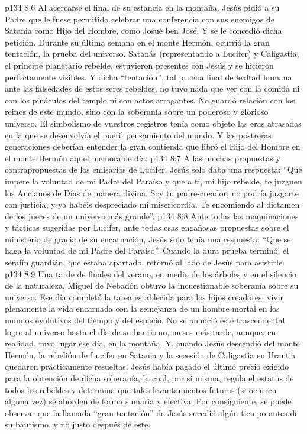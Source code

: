 \vs p134 8:6 \pc Al acercarse el final de su estancia en la montaña, Jesús pidió a su Padre que le fuese permitido celebrar una conferencia con sus enemigos de Satania como Hijo del Hombre, como Josué ben José. Y se le concedió dicha petición. Durante su última semana en el monte Hermón, ocurrió la gran tentación, la prueba del universo. Satanás (representando a Lucifer) y Caligastia, el príncipe planetario rebelde, estuvieron presentes con Jesús y se hicieron perfectamente visibles. Y dicha “tentación”, tal prueba final de lealtad humana ante las falsedades de estos seres rebeldes, no tuvo nada que ver con la comida ni con los pináculos del templo ni con actos arrogantes. No guardó relación con los reinos de este mundo, sino con la soberanía sobre un poderoso y glorioso universo. El simbolismo de vuestros registros tenía como objeto las eras atrasadas en la que se desenvolvía el pueril pensamiento del mundo. Y las postreras generaciones deberían entender la gran contienda que libró el Hijo del Hombre en el monte Hermón aquel memorable día.
\vs p134 8:7 A las muchas propuestas y contrapropuestas de los emisarios de Lucifer, Jesús solo daba una respuesta: “Que impere la voluntad de mi Padre del Paraíso y que a ti, mi hijo rebelde, te juzguen los Ancianos de Días de manera divina. Soy tu padre\hyp{}creador; no podría juzgarte con justicia, y ya habéis despreciado mi misericordia. Te encomiendo al dictamen de los jueces de un universo más grande”.
\vs p134 8:8 Ante todas las maquinaciones y tácticas sugeridas por Lucifer, ante todas esas engañosas propuestas sobre el ministerio de gracia de su encarnación, Jesús solo tenía una respuesta: “Que se haga la voluntad de mi Padre del Paraíso”. Cuando la dura prueba terminó, el serafín guardián, que estaba apartado, retornó al lado de Jesús para asistirle.
\vs p134 8:9 \pc Una tarde de finales del verano, en medio de los árboles y en el silencio de la naturaleza, Miguel de Nebadón obtuvo la incuestionable soberanía sobre su universo. Ese día completó la tarea establecida para los hijos creadores: vivir plenamente la vida encarnada con la semejanza de un hombre mortal en los mundos evolutivos del tiempo y del espacio. No se anunció este trascendental logro al universo hasta el día de su bautismo, meses más tarde, aunque, en realidad, tuvo lugar ese día, en la montaña. Y, cuando Jesús descendió del monte Hermón, la rebelión de Lucifer en Satania y la secesión de Caligastia en Urantia quedaron prácticamente resueltas. Jesús había pagado el último precio exigido para la obtención de dicha soberanía, la cual, por sí misma, regula el estatus de todos los rebeldes y determina que tales levantamientos futuros (si ocurren alguna vez) se aborden de forma sumaria y efectiva. Por consiguiente, se puede observar que la llamada “gran tentación” de Jesús sucedió algún tiempo antes de su bautismo, y no justo después de este.
